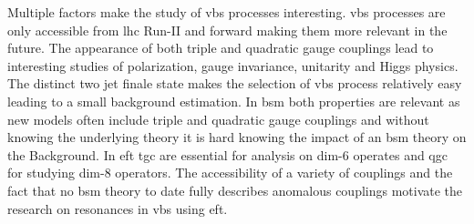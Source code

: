 \documentclass[../Bachelorarbeit.tex]{subfiles}
\begin{document}
Multiple factors make the study of \acrshort{vbs} processes interesting. \acrshort{vbs} processes are only accessible from \acrshort{lhc} Run-II and forward making them more relevant in the future.
The appearance of both triple and quadratic gauge couplings lead to interesting studies of polarization, gauge invariance, unitarity and Higgs physics.
The distinct two jet finale state makes the selection of \acrshort{vbs} process relatively easy leading to a small background estimation. In \acrshort{bsm} both properties
are relevant as new models often include triple and quadratic gauge couplings and without knowing the underlying theory it is hard knowing the impact of an \acrshort{bsm} theory on the Background.
In \acrshort{eft} \acrshort{tgc} are essential for analysis on dim-6 operates and \acrshort{qgc} for studying dim-8 operators. The accessibility of a variety of couplings and
the fact that no \acrshort{bsm} theory to date fully describes anomalous couplings motivate the research on resonances in \acrshort{vbs} using \acrshort{eft}.
\end{document}
